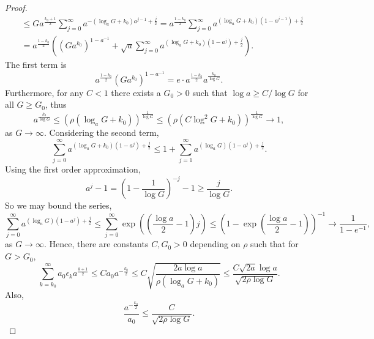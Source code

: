 \begin{proof}
\begin{align*}
    &\le G a^{\frac{k_0 + 1}{2}} \sum_{j=0}^\infty a^{-(\log_a G + k_0) a^{j-1} + \frac j2} = a^{\frac{1 - k_0}{2}} \sum_{j=0}^\infty a^{(\log_a G + k_0) (1 - a^{j-1}) + \frac j2}\\
    &= a^{\frac{1 - k_0}{2}} \left( \left(G a^{k_0}\right)^{1 - a^{-1}} + \sqrt a \sum_{j=0}^\infty a^{(\log_a G + k_0) (1 - a^{j}) + \frac j2} \right).
\end{align*}
The first term is
\begin{equation*}
    a^{\frac{1 - k_0}{2}} \left( G a^{k_0} \right)^{1 - a^{-1}} = e \cdot a^{\frac{1 - k_0}{2}} a^{\frac{k_0}{\log G}}.
\end{equation*}
Furthermore, for any $C < 1$ there exists a $G_0 > 0$ such that $\log a \ge C / \log G$ for all $G \ge G_0$, thus
\begin{equation*}
    a^{\frac{k_0}{\log G}} \le \left( \rho (\log_a G + k_0) \right)^{\frac{1}{\log G}} \le \left( \rho (C \log^2 G + k_0) \right)^{\frac{1}{\log G}} \rightarrow 1,
\end{equation*}
as $G \rightarrow \infty$.
Considering the second term,
\begin{equation*}
    \sum_{j=0}^\infty a^{(\log_a G + k_0)(1 - a^j) + \frac j2} \le 1 + \sum_{j=1}^\infty a^{(\log_a G)(1 - a^j) + \frac j2}.
\end{equation*}
Using the first order approximation,
\begin{equation*}
    a^j - 1 = \left( 1 - \frac{1}{\log G} \right)^{-j} - 1 \ge \frac{j}{\log G}.
\end{equation*}
So we may bound the series,
\begin{equation*}
\sum_{j=0}^\infty a^{(\log_a G) (1 - a^j) + \frac j2} \le \sum_{j=0}^\infty \exp\left( \left(\frac{\log a}{2} - 1 \right) j \right) \le \left(1 - \exp\left( \frac{\log a}{2} - 1 \right) \right)^{-1}\rightarrow \frac{1}{1 - e^{-1}},
\end{equation*}
as $G \rightarrow \infty$.
Hence, there are constants $C, G_0 > 0$ depending on $\rho$ such that for $G > G_0$, 
\begin{equation}
\label{eq:Aterm2}
    \sum_{k=k_0}^\infty a_0 \epsilon_k a^{\frac{k+1}{2}} \le C a_0 a^{-\frac{k_0}{2}} \le C \sqrt{\frac{2 a \log a}{\rho (\log_a G + k_0)}} \le \frac{C \sqrt{2 a} \log a}{\sqrt{2 \rho \log G}}.
\end{equation}
Also, 
\begin{equation}
\label{eq:Aterm3}
    \frac{a^{-\frac{k_0}{2}}}{a_0} \le \frac{C}{\sqrt{2 \rho \log G}}.
\end{equation}

\end{proof}
